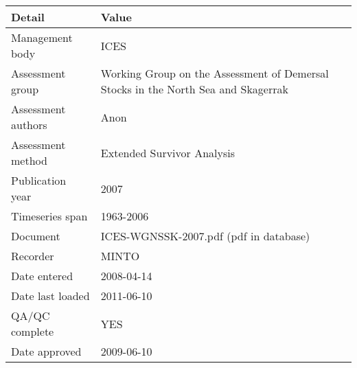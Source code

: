 \begin{table}[htb]
\centering
\begin{tabular}{lp{7cm}}
\toprule
Detail & Value \\
\midrule
Management body    & ICES                                                                              \\
Assessment group   & Working Group on the Assessment of Demersal Stocks in the North Sea and Skagerrak \\
Assessment authors & Anon                                                                              \\
Assessment method  & Extended Survivor Analysis                                                        \\
Publication year   & 2007                                                                              \\
Timeseries span    & 1963-2006                                                                         \\
Document           & ICES-WGNSSK-2007.pdf (pdf in database)                                            \\
Recorder           & MINTO                                                                             \\
Date entered       & 2008-04-14                                                                        \\
Date last loaded   & 2011-06-10                                                                        \\
QA/QC complete     & YES                                                                               \\
Date approved      & 2009-06-10                                                                        \\
\bottomrule
\end{tabular}
\label{tab:assessdet}
\end{table}
